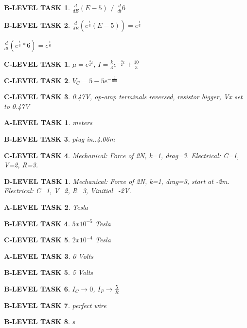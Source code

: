 \documentclass{book}
\numberwithin{equation}{section}
\newtheorem{alevel}{A-LEVEL TASK}
\newtheorem{blevel}{B-LEVEL TASK}
\newtheorem{clevel}{C-LEVEL TASK}
\newtheorem{dlevel}{D-LEVEL TASK}
\theoremstyle{definition}
\begin{document}
\begin{blevel}$\frac{d}{dE}(E-5) \neq \frac{d}{dt}6$\end{blevel}
\begin{blevel}$\frac{d}{dE}(e^{\frac{t}{6}}(E-5))=e^{\frac{t}{6}}$\par
$\frac{d}{dt}(e^{\frac{t}{6}}*6)=e^{\frac{t}{6}}$\end{blevel}

\begin{clevel}$\mu=e^{\frac{3}{2}t}$, $I=\frac{k}{3}e^{-\frac{3}{2}t}+\frac{10}{3}$\end{clevel}

\begin{clevel}$V_C=5-5e^{-\frac{t}{100}}$\end{clevel}
\begin{clevel}0.47V, op-amp terminals reversed, resistor bigger, Vx set to 0.47V\end{clevel}
\begin{alevel}meters\end{alevel}
\begin{blevel}plug in..4.06m\end{blevel}
\begin{clevel}Mechanical: Force of 2N, k=1, drag=3. Electrical: C=1, V=2, R=3.\end{clevel}
\begin{dlevel}Mechanical: Force of 2N, k=1, drag=3, start at -2m. Electrical: C=1, V=2, R=3, Vinitial=-2V.\end{dlevel}

\begin{alevel}Tesla\end{alevel}
\begin{blevel}$5x10^{-5}$ Tesla\end{blevel}
\begin{clevel}$2x10^{-4}$ Tesla\end{clevel}
\begin{alevel}0 Volts\end{alevel}
\begin{blevel}5 Volts\end{blevel}
\begin{blevel}$I_C \rightarrow 0$, $I_P \rightarrow \frac{5}{R}$ \end{blevel}
\begin{blevel}perfect wire\end{blevel}
\begin{blevel}s\end{blevel}
\end{document}
